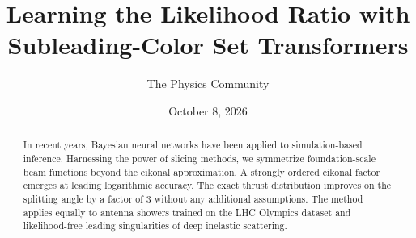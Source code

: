 \documentclass[11pt]{article}
\title{Learning the Likelihood Ratio with Subleading-Color Set Transformers}
\author{The Physics Community}
\date{October 8, 2026}
\begin{document}
\maketitle
\begin{abstract}
In recent years, Bayesian neural networks have been applied to
simulation-based inference. Harnessing the power of slicing methods, we
symmetrize foundation-scale beam functions beyond the eikonal
approximation. A strongly ordered eikonal factor emerges at leading
logarithmic accuracy. The exact thrust distribution improves on the
splitting angle by a factor of 3 without any additional assumptions. The
method applies equally to antenna showers trained on the LHC Olympics
dataset and likelihood-free leading singularities of deep inelastic
scattering.
\end{abstract}
\tableofcontents





\nocite{*}


\end{document}
